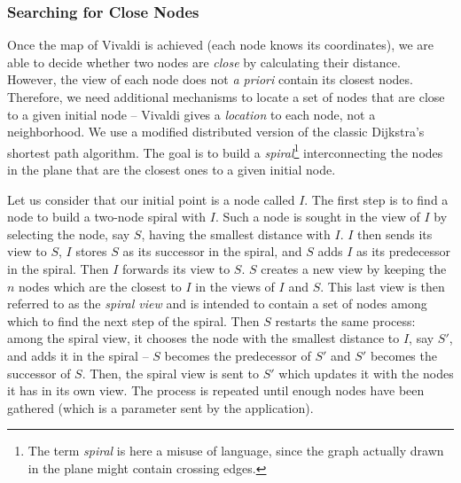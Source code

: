 

\subsubsection*{Searching for Close Nodes}

Once the map of Vivaldi is achieved (each node knows its coordinates), we are
able to decide whether two nodes are \emph{close} by calculating their
distance. However, the view of each node does not \emph{a priori} contain its
closest nodes. Therefore, we need additional mechanisms to locate a set of nodes
that are close to a given initial node -- Vivaldi gives a \emph{location} to
each node, not a neighborhood. We use a modified distributed version of the
classic Dijkstra's shortest path algorithm. The goal is to build a
\emph{spiral}\footnote{The term \emph{spiral} is here a misuse of language,
since the graph actually drawn in the plane might contain crossing edges.}
interconnecting the nodes in the plane that are the closest ones to a given
initial node.

Let us consider that our initial point is a node called $I$. The first step is
to find a node to build a two-node spiral with $I$. Such a node is sought in the
view of $I$ by selecting the node, say $S$, having the smallest distance with
$I$. $I$ then sends its view to $S$, $I$ stores $S$ as its successor in the
spiral, and $S$ adds $I$ as its predecessor in the spiral. Then $I$ forwards its
view to $S$. $S$ creates a new view by keeping the $n$ nodes which are the
closest to $I$ in the views of $I$ and $S$. This last view is then referred to
as the \emph{spiral view} and is intended to contain a set of nodes among which
to find the next step of the spiral. Then $S$ restarts the same process: among
the spiral view, it chooses the node with the smallest distance to $I$, say
$S'$, and adds it in the spiral -- $S$ becomes the predecessor of $S'$ and $S'$
becomes the successor of $S$. Then, the spiral view is sent to $S'$ which
updates it with the nodes it has in its own view. The process is repeated until
enough nodes have been gathered (which is a parameter sent by the application).

